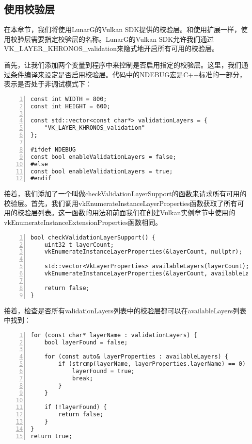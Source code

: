 \documentclass{ctexart}
\begin{document}
\subsection{使用校验层}

在本章节，我们将使用LunarG的Vulkan SDK提供的校验层。和使用扩展一样，使用校验层需要指定校验层的名称。LunarG的Vulkan SDK允许我们通过VK\_LAYER\_KHRONOS\_validation来隐式地开启所有可用的校验层。

首先，让我们添加两个变量到程序中来控制是否启用指定的校验层。这里，我们通过条件编译来设定是否启用校验层。代码中的NDEBUG宏是C++标准的一部分，表示是否处于非调试模式下：

\begin{lstlisting}[language={[ANSI]C},keywordstyle=\color{blue!70},commentstyle=\color{red!50!green!50!blue!50},frame=shadowbox, rulesepcolor=\color{red!20!green!20!blue!20},basicstyle=\small,numbers=left, numberstyle=\tiny,breaklines=true]
const int WIDTH = 800;
const int HEIGHT = 600;

const std::vector<const char*> validationLayers = {
	"VK_LAYER_KHRONOS_validation"
};

#ifdef NDEBUG
const bool enableValidationLayers = false;
#else
const bool enableValidationLayers = true;
#endif
\end{lstlisting}

接着，我们添加了一个叫做checkValidationLayerSupport的函数来请求所有可用的校验层。首先，我们调用vkEnumerateInstanceLayerProperties函数获取了所有可用的校验层列表。这一函数的用法和前面我们在创建Vulkan实例章节中使用的vkEnumerateInstanceExtensionProperties函数相同。

\begin{lstlisting}[language={[ANSI]C},keywordstyle=\color{blue!70},commentstyle=\color{red!50!green!50!blue!50},frame=shadowbox, rulesepcolor=\color{red!20!green!20!blue!20},basicstyle=\small,numbers=left, numberstyle=\tiny,breaklines=true]
bool checkValidationLayerSupport() {
	uint32_t layerCount;
	vkEnumerateInstanceLayerProperties(&layerCount, nullptr);

	std::vector<VkLayerProperties> availableLayers(layerCount);
	vkEnumerateInstanceLayerProperties(&layerCount, availableLayers.data());

	return false;
}
\end{lstlisting}

接着，检查是否所有validationLayers列表中的校验层都可以在availableLayers列表中找到：

\begin{lstlisting}[language={[ANSI]C},keywordstyle=\color{blue!70},commentstyle=\color{red!50!green!50!blue!50},frame=shadowbox, rulesepcolor=\color{red!20!green!20!blue!20},basicstyle=\small,numbers=left, numberstyle=\tiny,breaklines=true]
for (const char* layerName : validationLayers) {
	bool layerFound = false;

	for (const auto& layerProperties : availableLayers) {
		if (strcmp(layerName, layerProperties.layerName) == 0) {
			layerFound = true;
			break;
		}
	}

	if (!layerFound) {
		return false;
	}
}
return true;
\end{lstlisting}
\end{document}
